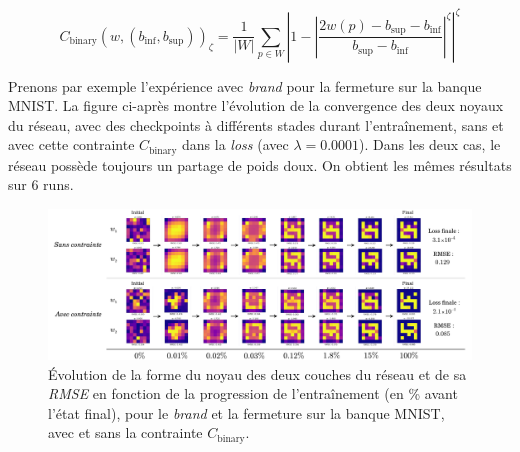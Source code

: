 \vspace{-0.4mm}
\begin{equation}
    C_\text{binary}(w, (b_\text{inf}, b_\text{sup}))_\zeta = 
    \frac{1}{ |W| } 
    \sum_{p \in W} 
    \left |
    1 - \left | \frac{ 2 w(p) - b_\text{sup} - b_\text{inf} }{ b_\text{sup} - b_\text{inf} } \right | ^\zeta
    \right | ^\zeta
    \label{erreur_binary}
\end{equation}

\vspace{4.5mm}
\noindent Prenons par exemple l'expérience avec \textit{brand} pour la fermeture sur la banque MNIST. La figure ci-après montre l'évolution de la convergence des deux noyaux du réseau, avec des checkpoints à différents stades durant l'entraînement, sans et avec cette contrainte $C_\text{binary}$ dans la \textit{loss} (avec $\lambda = 0.0001$). Dans les deux cas, le réseau possède toujours un partage de poids doux. On obtient les mêmes résultats sur 6 runs. \\


\vspace{-0.4mm}
\begin{figure}[htp]
  \begin{center}
    \includegraphics[width=1.00\linewidth]{parts/3-contributions/C-contraintes_geometriques/figures/k_binary.pdf}
    \vspace{-4.0mm}
    \caption{ \centering Évolution de la forme du noyau des deux couches du réseau et de sa \textit{RMSE} en fonction de la progression de l'entraînement (en \% avant l'état final), pour le \textit{brand} et la fermeture sur la banque MNIST, avec et sans la contrainte $C_\text{binary}$.}
    \label{fig:c_binary}
  \end{center}
\end{figure}

